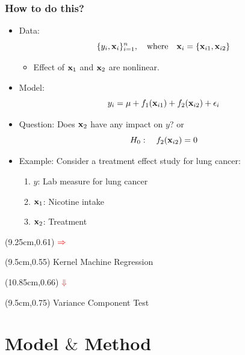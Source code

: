 \documentclass{beamer}
\begin{document}
\begin{frame}
\frametitle{How to do this?}
\begin{itemize}
\item Data: 
$$\{ y_i, {\bf x}_i \}_{i=1}^n, \quad \mbox{where} \quad 
{\bf x}_i= \{{\bf x}_{i1}, {\bf x}_{i2}\}$$
\begin{itemize}
\item Effect of ${\bf x}_1$ and ${\bf x}_2$ are nonlinear.
\end{itemize}
\item Model:
$$y_i=\mu + f_1({\bf x}_{i1})+ f_2({\bf x}_{i2})+\epsilon_i$$
\item Question: Does ${\bf x}_{2}$ have any impact on $y$? or
$$ H_0: \quad f_2({\bf x}_{i2}) = 0$$
\item Example: Consider a treatment effect study for lung cancer:
\begin{enumerate}
\item $y$: Lab measure for lung cancer
\item ${\bf x}_1$: Nicotine intake
\item ${\bf x}_2$: Treatment
\end{enumerate}
\end{itemize}

\begin{textblock*}{0.5cm}(9.25cm,0.61\textheight)
${\color{red} \mathbf{\Rightarrow}}$
\end{textblock*}

\begin{textblock*}{3cm}(9.5cm,0.55\textheight)
\centering
{\color{red} Kernel Machine Regression}
\end{textblock*}

\begin{textblock*}{0.5cm}(10.85cm,0.66\textheight)
${\color{red} \mathbf{\Downarrow}}$
\end{textblock*}

\begin{textblock*}{3cm}(9.5cm,0.75\textheight)
\centering
{\color{red} Variance Component Test}
\end{textblock*}
\end{frame}

\section{Model $\&$ Method}
\end{document}
